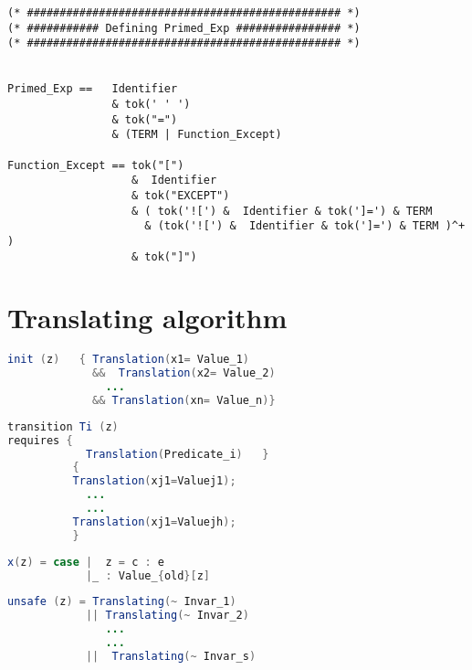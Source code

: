 \documentclass{article}
\theoremstyle{plain}
\numberwithin{equation}{section}
\begin{document}
\begin{lstlisting}
(* ################################################ *)
(* ########### Defining Primed_Exp ################ *)
(* ################################################ *)


Primed_Exp ==   Identifier 
                & tok(' ' ') 
                & tok("=")  
                & (TERM | Function_Except)
             
Function_Except == tok("[") 
                   &  Identifier  
                   & tok("EXCEPT") 
                   & ( tok('![') &  Identifier & tok(']=') & TERM 
                     & (tok('![') &  Identifier & tok(']=') & TERM )^+ ) 
                   & tok("]")
\end{lstlisting}





\section{Translating algorithm} 

\begin{lrbox}{\codebox}
   \begin{lstlisting}[language=java]
init (z)   { Translation(x1= Value_1) 
             &&  Translation(x2= Value_2) 
               ... 
             && Translation(xn= Value_n)}
\end{lstlisting}
\end{lrbox}


\begin{lrbox}{\codeboxa}
   \begin{lstlisting}[language=java]
transition Ti (z)  
requires {     
            Translation(Predicate_i)   }
          {
          Translation(xj1=Valuej1);
            ... 
            ...
          Translation(xj1=Valuejh);
          }  
\end{lstlisting}
\end{lrbox}



\begin{lrbox}{\codeboxb}
   \begin{lstlisting}[language=java]
x(z) = case |  z = c : e 
            |_ : Value_{old}[z]

\end{lstlisting}
\end{lrbox}




\begin{lrbox}{\codeboxu}
   \begin{lstlisting}[language=java]
unsafe (z) = Translating(~ Invar_1) 
            || Translating(~ Invar_2)
               ...
               ...
            ||  Translating(~ Invar_s)

\end{lstlisting}
\end{lrbox}
\end{document}
